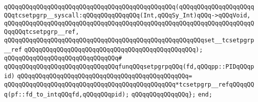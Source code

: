 \verb|qQQqqQQqqQQqqQQqqQQqqQQqqQQqqQQqqQQqqQQqqQQqqQQq(qQQqqQQqqQQqqQQqqQQqqQQqtcsetpgrp__syscall:qQQqqQQqqQQqqQQq(Int,qQQqSy_Int)qQQq->qQQqVoid,|\newline
\verb|qQQqqQQqqQQqqQQqqQQqqQQqqQQqqQQqqQQqqQQqqQQqqQQqqQQqqQQqqQQqqQQqqQQqqQQqqQQqtcsetpgrp__ref,|\newline
\verb|qQQqqQQqqQQqqQQqqQQqqQQqqQQqqQQqqQQqqQQqqQQqqQQqqQQqqQQqset__tcsetpgrp__ref|\newline
\verb|qQQqqQQqqQQqqQQqqQQqqQQqqQQqqQQqqQQqqQQqqQQqqQQq);|\newline
\verb|qQQqqQQqqQQqqQQqqQQqqQQqqQQqqQQq#|\newline
\verb|qQQqqQQqqQQqqQQqqQQqqQQqqQQqqQQqfunqQQqsetpgrpqQQq(fd,qQQqpp::PIDqQQqpid)|\newline
\verb|qQQqqQQqqQQqqQQqqQQqqQQqqQQqqQQqqQQqqQQqqQQqqQQq=|\newline
\verb|qQQqqQQqqQQqqQQqqQQqqQQqqQQqqQQqqQQqqQQqqQQqqQQq*tcsetpgrp__refqQQqqQQq(pf::fd_to_intqQQqfd,qQQqqQQqpid);|\newline
\verb|qQQqqQQqqQQqqQQq};|\newline
\verb|end;|\newline
\newline
\newline
\newline

